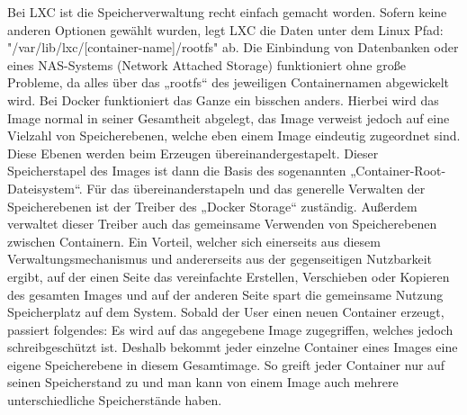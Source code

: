 Bei LXC ist die Speicherverwaltung recht einfach gemacht worden. Sofern keine anderen Optionen gewählt wurden, legt LXC die Daten unter dem Linux Pfad: "/var/lib/lxc/[container-name]/rootfs" ab. Die Einbindung von Datenbanken oder eines NAS-Systems (Network Attached Storage) funktioniert ohne große Probleme, da alles über das „rootfs“ des jeweiligen Containernamen abgewickelt wird.
Bei Docker funktioniert das Ganze ein bisschen anders. Hierbei wird das Image normal in seiner Gesamtheit abgelegt, das Image verweist jedoch auf eine Vielzahl von Speicherebenen, welche eben einem Image eindeutig zugeordnet sind. Diese Ebenen werden beim Erzeugen übereinandergestapelt. Dieser Speicherstapel des Images ist dann die Basis des sogenannten „Container-Root-Dateisystem“. Für das übereinanderstapeln und das generelle Verwalten der Speicherebenen ist der Treiber des „Docker Storage“ zuständig. Außerdem verwaltet dieser Treiber auch das gemeinsame Verwenden von Speicherebenen zwischen Containern. Ein Vorteil, welcher sich einerseits aus diesem Verwaltungsmechanismus und andererseits aus der gegenseitigen Nutzbarkeit ergibt, auf der einen Seite das vereinfachte Erstellen, Verschieben oder Kopieren des gesamten Images und auf der anderen Seite spart die gemeinsame Nutzung Speicherplatz auf dem System.
Sobald der User einen neuen Container erzeugt, passiert folgendes: Es wird auf das angegebene Image zugegriffen, welches jedoch schreibgeschützt ist. Deshalb bekommt jeder einzelne Container eines Images eine eigene Speicherebene in diesem Gesamtimage. So greift jeder Container nur auf seinen Speicherstand zu und man kann von einem Image auch mehrere unterschiedliche Speicherstände haben.

